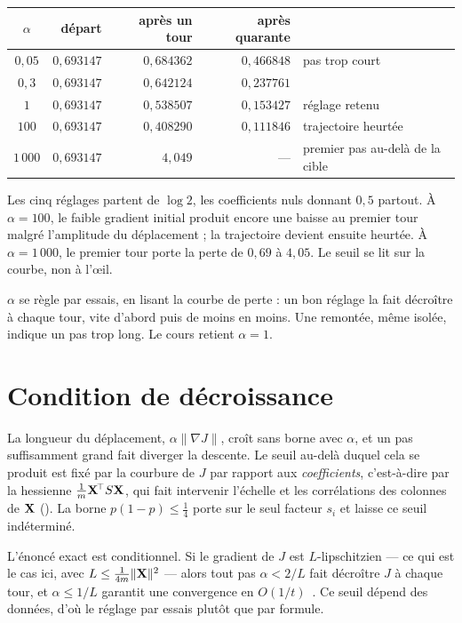 \begin{chiffres}
\begin{center}
\begin{tabular}{crrrl}
\toprule
$\alpha$ & départ & après un tour & après quarante & \\
\midrule
$0{,}05$ & $0{,}693147$ & $0{,}684362$ & $0{,}466848$ & pas trop court \\
$0{,}3$  & $0{,}693147$ & $0{,}642124$ & $0{,}237761$ & \\
$1$      & $0{,}693147$ & $0{,}538507$ & $0{,}153427$ & réglage retenu \\
$100$    & $0{,}693147$ & $0{,}408290$ & $0{,}111846$ & trajectoire heurtée \\
$1\,000$ & $0{,}693147$ & $4{,}049$    & --- & premier pas au-delà de la cible \\
\bottomrule
\end{tabular}
\end{center}
Les cinq réglages partent de $\log 2$, les coefficients nuls donnant $0{,}5$
partout. À $\alpha=100$, le faible gradient initial produit encore une baisse
au premier tour malgré l'amplitude du déplacement ; la trajectoire devient
ensuite heurtée. À $\alpha=1\,000$, le premier tour porte
la perte de $0{,}69$ à $4{,}05$. Le seuil se lit sur la courbe, non à l'{\oe}il.
\end{chiffres}

$\alpha$ se règle par essais, en lisant la courbe de perte : un bon réglage la
fait décroître à chaque tour, vite d'abord puis de moins en moins. Une remontée,
même isolée, indique un pas trop long. Le cours retient $\alpha=1$.

\section{Condition de décroissance}

La longueur du déplacement, $\alpha\|\nabla J\|$, croît sans borne avec $\alpha$,
et un pas suffisamment grand fait diverger la descente. Le seuil au-delà duquel
cela se produit est fixé par la courbure de $J$ par rapport aux
\emph{coefficients}, c'est-à-dire par la hessienne
$\tfrac{1}{m}\mathbf{X}^{\!\top}S\mathbf{X}$, qui fait intervenir l'échelle et les corrélations
des colonnes de $\mathbf{X}$ (). La borne $p(1-p)\leq\frac14$
porte sur le seul facteur $s_i$ et laisse ce seuil indéterminé.

L'énoncé exact est conditionnel. Si le gradient de $J$ est $L$-lipschitzien ---
ce qui est le cas ici, avec $L\leq\tfrac{1}{4m}\|\mathbf{X}\|^2$ --- alors tout pas
$\alpha<2/L$ fait décroître $J$ à chaque tour, et $\alpha\leq1/L$ garantit une
convergence en $O(1/t)$~\cite{nocedal2006,boyd2004}. Ce seuil dépend des données,
d'où le réglage par essais plutôt que par formule.

